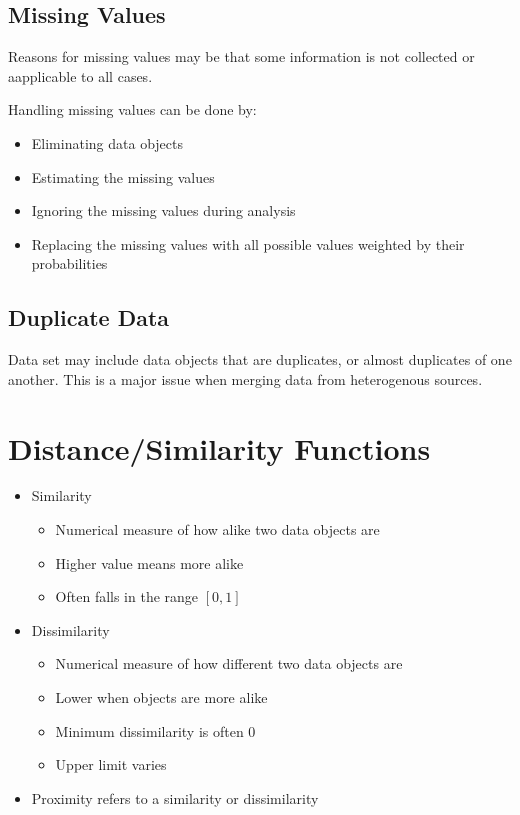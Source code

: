 \subsection{Missing Values}
Reasons for missing values may be that some information is not collected or aapplicable to all cases.

Handling missing values can be done by:

\begin{itemize}
    \item Eliminating data objects
    \item Estimating the missing values
    \item Ignoring the missing values during analysis
    \item Replacing the missing values with all possible values weighted by their probabilities
\end{itemize}

\subsection{Duplicate Data}
Data set may include data objects that are duplicates, or almost duplicates of one another.
This is a major issue when merging data from heterogenous sources.

\section{Distance/Similarity Functions}
\begin{itemize}
    \item Similarity
    \begin{itemize}
        \item Numerical measure of how alike two data objects are
        \item Higher value means more alike
        \item Often falls in the range $[0,1]$
    \end{itemize}
    \item Dissimilarity
    \begin{itemize}
        \item Numerical measure of how different two data objects are
        \item Lower when objects are more alike
        \item Minimum dissimilarity is often 0
        \item Upper limit varies
    \end{itemize}
    \item Proximity refers to a similarity or dissimilarity
\end{itemize}

